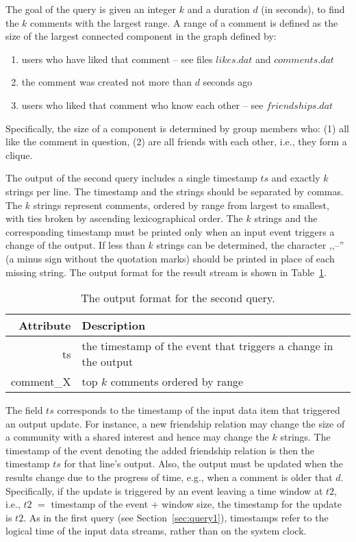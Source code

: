 \documentclass{sig-alternate}
\begin{document}
The goal of the query is given an integer $k$ and a duration $d$ (in seconds), to find the $k$ comments with the largest range. A range of a comment is defined as the size of the largest connected component in the graph defined by:  
\begin{enumerate}
		\item users who have liked that comment -- see files $likes.dat$ and $comments.dat$
		\item the comment was created not more than $d$ seconds ago
		\item users who liked that comment who know each other -- see $friendships.dat$
\end{enumerate}	
Specifically, the size of a component is determined by group members who: (1) all like the comment in question, (2) are all friends with each other, i.e., they form a clique.

The output of the second query includes a single timestamp $ts$ and exactly $k$ strings per line. The timestamp and the strings should be separated by commas. The $k$ strings represent comments, ordered by range from largest to smallest, with ties broken by ascending lexicographical order. The $k$ strings and the corresponding timestamp must be printed only when an input event triggers a change of the output. If less than $k$ strings can be determined, the character ,,--'' (a minus sign without the quotation marks) should be printed in place of each missing string. The output format for the result stream is shown in Table~\ref{table:query2}. 

\begin{table}[ht]
	\caption{The output format for the second query.}
	\centering 
	\begin{tabular}{r p{5.2cm}}
		\toprule
		Attribute		&	 Description\\
		\midrule
		ts			&	the timestamp of the event that triggers a change in the output\\[2ex]
		comment\_X	&	top $k$ comments ordered by range\\[2ex]		
		\bottomrule 
	\end{tabular}
	\label{table:query2}
\end{table}

The field $ts$ corresponds to the timestamp of the input data item that triggered an output update. For instance, a new friendship relation may change the size of a community with a shared interest and hence may change the $k$ strings. The timestamp of the event denoting the added friendship relation is then the timestamp $ts$ for that line's output. Also, the output must be updated when the results change due to the progress of time, e.g., when a comment is older that $d$. Specifically, if the update is triggered by an event leaving a time window at $t2$, i.e., $t2$ $=$ timestamp of the event $+$ window size, the timestamp for the update is $t2$. As in the first query (see Section~\ref{sec:query1}), timestamps refer to the logical time of the input data streams, rather than on the system clock.
\end{document}

